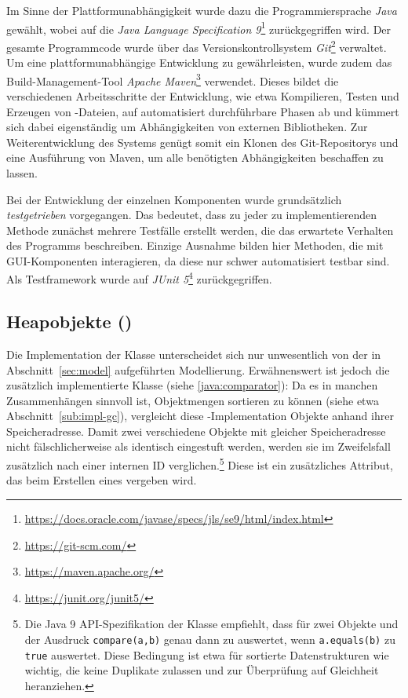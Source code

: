 Im Sinne der Plattformunabhängigkeit wurde dazu die Programmiersprache \textit{Java} gewählt, wobei auf die \textit{Java Language Specification 9}\footnote{\url{https://docs.oracle.com/javase/specs/jls/se9/html/index.html}} zurückgegriffen wird.
Der gesamte Programmcode wurde über das Versionskontrollsystem \textit{Git}\footnote{\url{https://git-scm.com/}} verwaltet.
Um eine plattformunabhängige Entwicklung zu gewährleisten, wurde zudem das Build-Management-Tool \textit{Apache Maven}\footnote{\url{https://maven.apache.org/}} verwendet.
Dieses bildet die verschiedenen Arbeitsschritte der Entwicklung, wie etwa Kompilieren, Testen und Erzeugen von -Dateien, auf automatisiert durchführbare Phasen ab und kümmert sich dabei eigenständig um Abhängigkeiten von externen Bibliotheken.
Zur Weiterentwicklung des Systems genügt somit ein Klonen des Git-Repositorys und eine Ausführung von Maven, um alle benötigten Abhängigkeiten beschaffen zu lassen.

Bei der Entwicklung der einzelnen Komponenten wurde grundsätzlich \textit{testgetrieben} vorgegangen.
Das bedeutet, dass zu jeder zu implementierenden Methode zunächst mehrere Testfälle erstellt werden, die das erwartete Verhalten des Programms beschreiben.
Einzige Ausnahme bilden hier Methoden, die mit GUI-Komponenten interagieren, da diese nur schwer automatisiert testbar sind.
Als Testframework wurde auf \textit{JUnit 5}\footnote{\url{https://junit.org/junit5/}} zurückgegriffen.

\subsection{Heapobjekte ()}
\label{sub:heapobject}
Die Implementation der Klasse  unterscheidet sich nur unwesentlich von der in Abschnitt~\ref{sec:model} aufgeführten Modellierung.
Erwähnenswert ist jedoch die zusätzlich implementierte Klasse  (siehe \ref{java:comparator}):
Da es in manchen Zusammenhängen sinnvoll ist, Objektmengen sortieren zu können (siehe etwa Abschnitt~\ref{sub:impl-gc}), vergleicht diese -Implementation Objekte anhand ihrer Speicheradresse.
Damit zwei verschiedene Objekte mit gleicher Speicheradresse nicht fälschlicherweise als identisch eingestuft werden, werden sie im Zweifelsfall zusätzlich nach einer internen ID verglichen.\footnote{Die Java 9 API-Spezifikation der Klasse  empfiehlt, dass für zwei Objekte  und  der Ausdruck \texttt{compare(a,b)} genau dann zu  auswertet, wenn \texttt{a.equals(b)} zu \texttt{true} auswertet. Diese Bedingung ist etwa für sortierte Datenstrukturen wie  wichtig, die keine Duplikate zulassen und  zur Überprüfung auf Gleichheit heranziehen.}
Diese ist ein zusätzliches Attribut, das beim Erstellen eines  vergeben wird.

